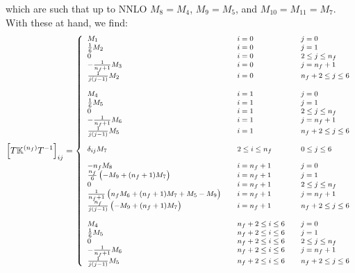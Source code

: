 \documentclass[10pt,a4paper]{article}
\begin{document}
which are such that up to NNLO $M_8=M_4$, $M_9=M_5$, and
$M_{10}=M_{11}=M_7$. With these at hand, we find:
\begin{equation}
\footnotesize
\left[T\mathbb{K}^{(n_f)}T^{-1}\right]_{ij} =
\left\{
\begin{array}{lll}
M_1 & \quad i = 0 &\quad j = 0\\
\frac{1}{6}M_2 & \quad i = 0 &\quad  j = 1\\
0 & \quad i = 0 &\quad  2\leq j \leq n_f\\
-\frac{1}{n_f+1}M_3 & \quad i = 0 &\quad  j = n_f+1\\
\frac{1}{j(j-1)}M_2 & \quad i = 0 &\quad  n_f+ 2\leq j \leq 6\\
\\
M_4 & \quad i = 1&\quad  j=0\\
\frac16 M_5 & \quad i = 1 &\quad  j=1\\
0 & \quad i = 1 &\quad  2\leq j \leq n_f\\
-\frac{1}{n_f+1}M_6 & \quad i = 1 &\quad  j = n_f+1\\
\frac{1}{j(j-1)}M_5 & \quad i = 1 &\quad  n_f+
                                                            2\leq j
                                                            \leq 6\\
\\
\delta_{ij}M_7&\quad 2\leq i \leq n_f &\quad 0\leq j
                                                         \leq 6\\
\\
-n_fM_8 &\quad i = n_f+1 &\quad j =0\\
\frac{n_f}6\left(-M_9+(n_f+1)M_7\right) &\quad i = n_f+1 &\quad j =1\\
0 & \quad i = n_f+1 &\quad  2\leq j \leq n_f\\
\frac1{n_f+1}\left(n_f M_6+(n_f+1)M_7+M_5-M_9\right) &\quad i = n_f+1 &\quad j =n_f+1\\
\frac{n_f}{j(j-1)}\left( -M_9+(n_f+1)M_7\right) &\quad i = n_f+1
                  &\quad n_f+2 \leq j \leq 6\\
\\
M_4 & \quad n_f+2\leq i \leq 6 &\quad  j=0\\
\frac16 M_5 & \quad n_f+2\leq i \leq 6 &\quad  j=1\\
0 & \quad n_f+2\leq i \leq 6 &\quad  2\leq j \leq n_f\\
-\frac{1}{n_f+1}M_6 & \quad n_f+2\leq i \leq 6 &\quad  j = n_f+1\\
\frac{1}{j(j-1)}M_5 & \quad n_f+2\leq i \leq 6 &\quad  n_f+
                                                            2\leq j
                                                            \leq 6\\
\end{array}
\right.
\label{eq:algorithmEvN3LO}
\end{equation}
\end{document}
